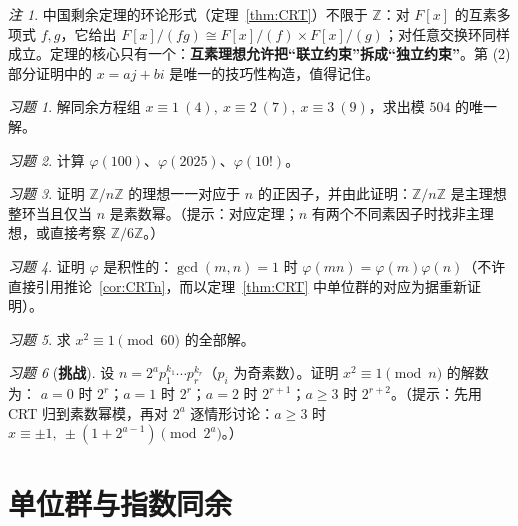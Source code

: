 \documentclass[a4paper,11pt]{ctexart}
\numberwithin{equation}{section}
\theoremstyle{plain}
\theoremstyle{definition}
\theoremstyle{remark}
\newtheorem{remark}[theorem]{注}
\newtheorem{exercise}{习题}[section]
\newcommand{\Z}{\mathbb{Z}}
\begin{document}
\begin{remark}
中国剩余定理的环论形式（定理~\ref{thm:CRT}）不限于 $\Z$：对 $F[x]$ 的互素多项式 $f,g$，它给出 $F[x]/(fg)\cong F[x]/(f)\times F[x]/(g)$；对任意交换环同样成立。定理的核心只有一个：\textbf{互素理想允许把“联立约束”拆成“独立约束”}。第 (2) 部分证明中的 $x=aj+bi$ 是唯一的技巧性构造，值得记住。
\end{remark}

\begin{exercise}\label{ex:4-1}
解同余方程组 $x\equiv1\ (4),\ x\equiv2\ (7),\ x\equiv3\ (9)$，求出模 $504$ 的唯一解。
\end{exercise}

\begin{exercise}\label{ex:4-2}
计算 $\varphi(100)$、$\varphi(2025)$、$\varphi(10!)$。
\end{exercise}

\begin{exercise}\label{ex:4-3}
证明 $\Z/n\Z$ 的理想一一对应于 $n$ 的正因子，并由此证明：$\Z/n\Z$ 是主理想整环当且仅当 $n$ 是素数幂。（提示：对应定理；$n$ 有两个不同素因子时找非主理想，或直接考察 $\Z/6\Z$。）
\end{exercise}

\begin{exercise}\label{ex:4-4}
证明 $\varphi$ 是积性的：$\gcd(m,n)=1$ 时 $\varphi(mn)=\varphi(m)\varphi(n)$（不许直接引用推论~\ref{cor:CRTn}，而以定理~\ref{thm:CRT} 中单位群的对应为据重新证明）。
\end{exercise}

\begin{exercise}\label{ex:4-5}
求 $x^2\equiv 1 \pmod{60}$ 的全部解。
\end{exercise}

\begin{exercise}[\textbf{挑战}]\label{ex:4-6}
设 $n=2^{a}p_1^{k_1}\cdots p_r^{k_r}$（$p_i$ 为奇素数）。证明 $x^2\equiv1\pmod n$ 的解数为：
$a=0$ 时 $2^{r}$；$a=1$ 时 $2^r$；$a=2$ 时 $2^{r+1}$；$a\ge3$ 时 $2^{r+2}$。（提示：先用 CRT 归到素数幂模，再对 $2^a$ 逐情形讨论：$a\ge3$ 时 $x\equiv\pm1,\ \pm(1+2^{a-1}) \pmod{2^a}$。）
\end{exercise}

\newpage

\section{单位群与指数同余}\label{sec:group}
\end{document}
